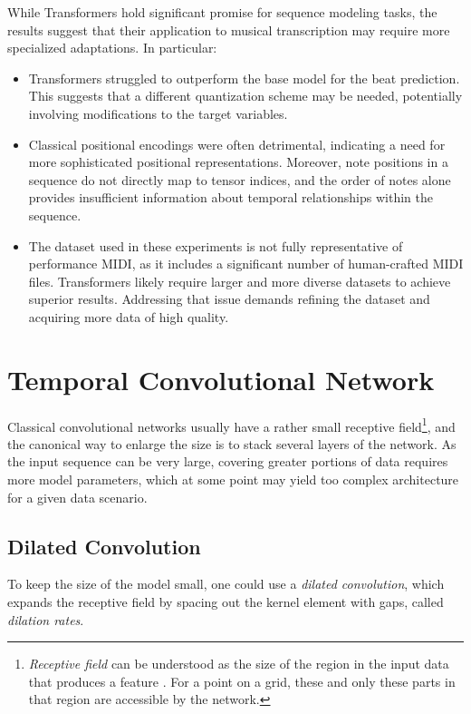 While Transformers hold significant promise for sequence modeling tasks, the results suggest that their application to musical transcription may require more specialized adaptations. In particular: \begin{itemize}
	\item Transformers struggled to outperform the base model for the beat prediction. This suggests that a different quantization scheme may be needed, potentially involving modifications to the target variables.
	\item Classical positional encodings were often detrimental, indicating a need for more sophisticated positional representations. Moreover, note positions in a sequence do not directly map to tensor indices, and the order of notes alone provides insufficient information about temporal relationships within the sequence.
	\item  The dataset used in these experiments is not fully representative of performance MIDI, as it includes a significant number of human-crafted MIDI files. Transformers likely require larger and more diverse datasets to achieve superior results. Addressing that issue demands refining the dataset and acquiring more data of high quality.
\end{itemize}

\section{Temporal Convolutional Network}

Classical convolutional networks usually have a rather small receptive field\footnote{\emph{Receptive field} can be understood as the size of the region in the input data that produces a feature \cite{Araujo2019}. For a point on a grid, these and only these parts in that region are accessible by the network.}, and the canonical way to enlarge the size is to stack several layers of the network. As the input sequence can be very large, covering greater portions of data requires more model parameters, which at some point may yield too complex architecture for a given data scenario.

\subsection{Dilated Convolution}

To keep the size of the model small, one could use a \emph{dilated convolution}, which expands the receptive field by spacing out the kernel element with gaps, called \emph{dilation rates}.

